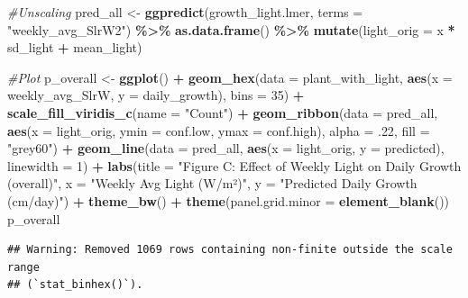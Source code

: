 \documentclass[
]{article}
\newenvironment{Shaded}{\begin{snugshade}}{\end{snugshade}}
\newcommand{\AttributeTok}[1]{\textcolor[rgb]{0.13,0.29,0.53}{#1}}
\newcommand{\CommentTok}[1]{\textcolor[rgb]{0.56,0.35,0.01}{\textit{#1}}}
\newcommand{\DecValTok}[1]{\textcolor[rgb]{0.00,0.00,0.81}{#1}}
\newcommand{\FunctionTok}[1]{\textcolor[rgb]{0.13,0.29,0.53}{\textbf{#1}}}
\newcommand{\NormalTok}[1]{#1}
\newcommand{\OtherTok}[1]{\textcolor[rgb]{0.56,0.35,0.01}{#1}}
\newcommand{\SpecialCharTok}[1]{\textcolor[rgb]{0.81,0.36,0.00}{\textbf{#1}}}
\newcommand{\StringTok}[1]{\textcolor[rgb]{0.31,0.60,0.02}{#1}}
\begin{document}
\begin{Shaded}
\begin{Highlighting}[]
\CommentTok{\#Unscaling}
\NormalTok{pred\_all }\OtherTok{\textless{}{-}} \FunctionTok{ggpredict}\NormalTok{(growth\_light.lmer, }\AttributeTok{terms =} \StringTok{"weekly\_avg\_SlrW2"}\NormalTok{) }\SpecialCharTok{\%\textgreater{}\%}
  \FunctionTok{as.data.frame}\NormalTok{() }\SpecialCharTok{\%\textgreater{}\%}
  \FunctionTok{mutate}\NormalTok{(}\AttributeTok{light\_orig =}\NormalTok{ x }\SpecialCharTok{*}\NormalTok{ sd\_light }\SpecialCharTok{+}\NormalTok{ mean\_light)}

\CommentTok{\#Plot}
\NormalTok{p\_overall }\OtherTok{\textless{}{-}} \FunctionTok{ggplot}\NormalTok{() }\SpecialCharTok{+}
  \FunctionTok{geom\_hex}\NormalTok{(}\AttributeTok{data =}\NormalTok{ plant\_with\_light,}
           \FunctionTok{aes}\NormalTok{(}\AttributeTok{x =}\NormalTok{ weekly\_avg\_SlrW, }\AttributeTok{y =}\NormalTok{ daily\_growth), }\AttributeTok{bins =} \DecValTok{35}\NormalTok{) }\SpecialCharTok{+}
  \FunctionTok{scale\_fill\_viridis\_c}\NormalTok{(}\AttributeTok{name =} \StringTok{"Count"}\NormalTok{) }\SpecialCharTok{+}
  \FunctionTok{geom\_ribbon}\NormalTok{(}\AttributeTok{data =}\NormalTok{ pred\_all,}
              \FunctionTok{aes}\NormalTok{(}\AttributeTok{x =}\NormalTok{ light\_orig, }\AttributeTok{ymin =}\NormalTok{ conf.low, }\AttributeTok{ymax =}\NormalTok{ conf.high),}
              \AttributeTok{alpha =}\NormalTok{ .}\DecValTok{22}\NormalTok{, }\AttributeTok{fill =} \StringTok{"grey60"}\NormalTok{) }\SpecialCharTok{+}
  \FunctionTok{geom\_line}\NormalTok{(}\AttributeTok{data =}\NormalTok{ pred\_all,}
            \FunctionTok{aes}\NormalTok{(}\AttributeTok{x =}\NormalTok{ light\_orig, }\AttributeTok{y =}\NormalTok{ predicted), }\AttributeTok{linewidth =} \DecValTok{1}\NormalTok{) }\SpecialCharTok{+}
  \FunctionTok{labs}\NormalTok{(}\AttributeTok{title =} \StringTok{"Figure C: Effect of Weekly Light on Daily Growth (overall)"}\NormalTok{,}
       \AttributeTok{x =} \StringTok{"Weekly Avg Light (W/m²)"}\NormalTok{,}
       \AttributeTok{y =} \StringTok{"Predicted Daily Growth (cm/day)"}\NormalTok{) }\SpecialCharTok{+}
  \FunctionTok{theme\_bw}\NormalTok{() }\SpecialCharTok{+}
  \FunctionTok{theme}\NormalTok{(}\AttributeTok{panel.grid.minor =} \FunctionTok{element\_blank}\NormalTok{())}
\NormalTok{p\_overall}
\end{Highlighting}
\end{Shaded}

\begin{verbatim}
## Warning: Removed 1069 rows containing non-finite outside the scale range
## (`stat_binhex()`).
\end{verbatim}
\end{document}
